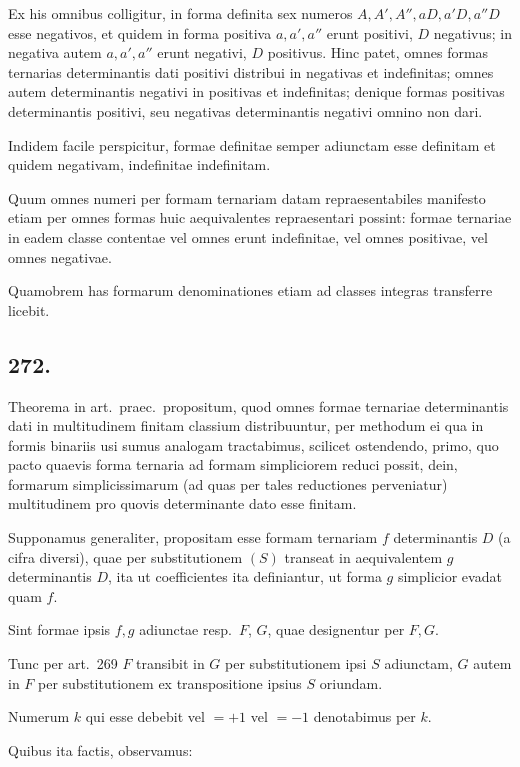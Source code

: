 \documentclass[12pt,a4paper]{article}
\theoremstyle{plain}
\theoremstyle{definition}
\theoremstyle{remark}
\begin{document}
Ex his omnibus colligitur, in forma definita sex numeros $A, A', A'', aD, a'D, a''D$ esse negativos, et quidem in forma positiva $a, a', a''$ erunt positivi, $D$ negativus; in negativa autem $a, a', a''$ erunt negativi, $D$ positivus. Hinc patet, omnes formas ternarias determinantis dati positivi distribui in negativas et indefinitas; omnes autem determinantis negativi in positivas et indefinitas; denique formas positivas determinantis positivi, seu negativas determinantis negativi omnino non dari.

Indidem facile perspicitur, formae definitae semper adiunctam esse definitam et quidem negativam, indefinitae indefinitam.

Quum omnes numeri per formam ternariam datam repraesentabiles manifesto etiam per omnes formas huic aequivalentes repraesentari possint: formae ternariae in eadem classe contentae vel omnes erunt indefinitae, vel omnes positivae, vel omnes negativae.

Quamobrem has formarum denominationes etiam ad classes integras transferre licebit.

\subsection*{272.}

Theorema in art.\ praec.\ propositum, quod omnes formae ternariae determinantis dati in multitudinem finitam classium distribuuntur, per methodum ei qua in formis binariis usi sumus analogam tractabimus, scilicet ostendendo, primo, quo pacto quaevis forma ternaria ad formam simpliciorem reduci possit, dein, formarum simplicissimarum (ad quas per tales reductiones perveniatur) multitudinem pro quovis determinante dato esse finitam.

Supponamus generaliter, propositam esse formam ternariam $f$ determinantis $D$ (a cifra diversi), quae per substitutionem $(S)$ transeat in aequivalentem $g$ determinantis $D$, ita ut coefficientes ita definiantur, ut forma $g$ simplicior evadat quam $f$.

Sint formae ipsis $f,g$ adiunctae resp.\ $F$, $G$, quae designentur per $F, G$.

Tunc per art.\ 269 $F$ transibit in $G$ per substitutionem ipsi $S$ adiunctam, $G$ autem in $F$ per substitutionem ex transpositione ipsius $S$ oriundam.

Numerum $k$ qui esse debebit vel $= +1$ vel $= -1$ denotabimus per $k$.

Quibus ita factis, observamus:
\end{document}
